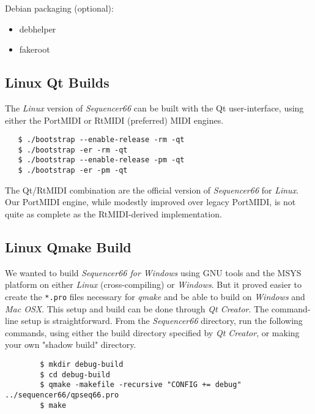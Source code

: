    Debian packaging (optional):

     \begin{itemize}
        \item debhelper
        \item fakeroot
     \end{itemize}

\subsection{Linux Qt Builds}
\label{subsec:seq66_build_Qt}

   The \textsl{Linux} version of \textsl{Sequencer66} can be built with the Qt
   user-interface, using either the PortMIDI or RtMIDI (preferred) MIDI
   engines.
 
\begin{verbatim}
   $ ./bootstrap --enable-release -rm -qt
   $ ./bootstrap -er -rm -qt
   $ ./bootstrap --enable-release -pm -qt
   $ ./bootstrap -er -pm -qt
\end{verbatim}

   The Qt/RtMIDI combination are the official version
   of \textsl{Sequencer66} for \textsl{Linux}.
   Our PortMIDI engine, while modestly improved over legacy PortMIDI, is not
   quite as complete as the RtMIDI-derived implementation.

\subsection{Linux Qmake Build}
\label{subsec:seq66_build_qmake}

   We wanted to build \textsl{Sequencer66 for Windows} using GNU tools and the
   MSYS platform on either \textsl{Linux} (cross-compiling) or
   \textsl{Windows}.  But it proved easier to create the
   \texttt{*.pro} files necessary for \textsl{qmake} and be able to build
   on \textsl{Windows} and \textsl{Mac OSX}.
   This setup and build can be done through \textsl{Qt Creator}.
   The command-line setup is straightforward.
   From the \textsl{Sequencer66} directory, run the following
   commands, using either the build directory specified by \textsl{Qt Creator},
   or making your own "shadow build" directory.

   \begin{verbatim}
        $ mkdir debug-build
        $ cd debug-build
        $ qmake -makefile -recursive "CONFIG += debug" ../sequencer66/qpseq66.pro
        $ make
   \end{verbatim}

